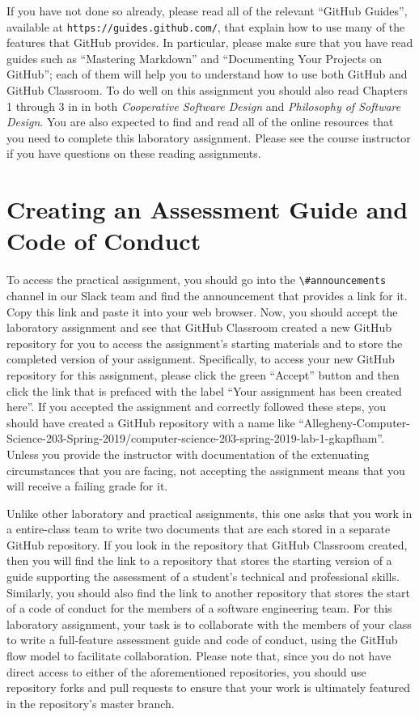 \documentclass[11pt]{article}
\newcommand{\cooperative}{{\em Cooperative Software Design\/}}
\newcommand{\philosophy}{{\em Philosophy of Software Design\/}}
\newcommand{\url}[1]{\lstinline{#1}}
\newcommand{\channel}[1]{\lstinline{#1}}
\begin{document}
If you have not done so already, please read all of the relevant ``GitHub
Guides'', available at \url{https://guides.github.com/}, that explain how to use
many of the features that GitHub provides. In particular, please make sure that
you have read guides such as ``Mastering Markdown'' and ``Documenting Your
Projects on GitHub''; each of them will help you to understand how to use both
GitHub and GitHub Classroom.
%
To do well on this assignment you should also read Chapters 1 through 3 in in
both \cooperative{} and \philosophy{}.
%
You are also expected to find and read all of the online resources that you need
to complete this laboratory assignment.
%
Please see the course instructor if you have questions on these reading
assignments.

\section*{Creating an Assessment Guide and Code of Conduct}


To access the practical assignment, you should go into the
\channel{\#announcements} channel in our Slack team and find the announcement
that provides a link for it. Copy this link and paste it into your web browser.
Now, you should accept the laboratory assignment and see that GitHub Classroom
created a new GitHub repository for you to access the assignment's starting
materials and to store the completed version of your assignment. Specifically,
to access your new GitHub repository for this assignment, please click the green
``Accept'' button and then click the link that is prefaced with the label ``Your
assignment has been created here''. If you accepted the assignment and correctly
followed these steps, you should have created a GitHub repository with a name
like
``Allegheny-Computer-Science-203-Spring-2019/computer-science-203-spring-2019-lab-1-gkapfham''.
Unless you provide the instructor with documentation of the extenuating
circumstances that you are facing, not accepting the assignment means that you
will receive a failing grade for it.


Unlike other laboratory and practical assignments, this one asks that you work
in a entire-class team to write two documents that are each stored in a separate
GitHub repository. If you look in the repository that GitHub Classroom created,
then you will find the link to a repository that stores the starting version of
a guide supporting the assessment of a student's technical and professional
skills. Similarly, you should also find the link to another repository that
stores the start of a code of conduct for the members of a software engineering
team. For this laboratory assignment, your task is to collaborate with the
members of your class to write a full-feature assessment guide and code of
conduct, using the GitHub flow model to facilitate collaboration. Please note
that, since you do not have direct access to either of the aforementioned
repositories, you should use repository forks and pull requests to ensure that
your work is ultimately featured in the repository's master branch.
\end{document}
